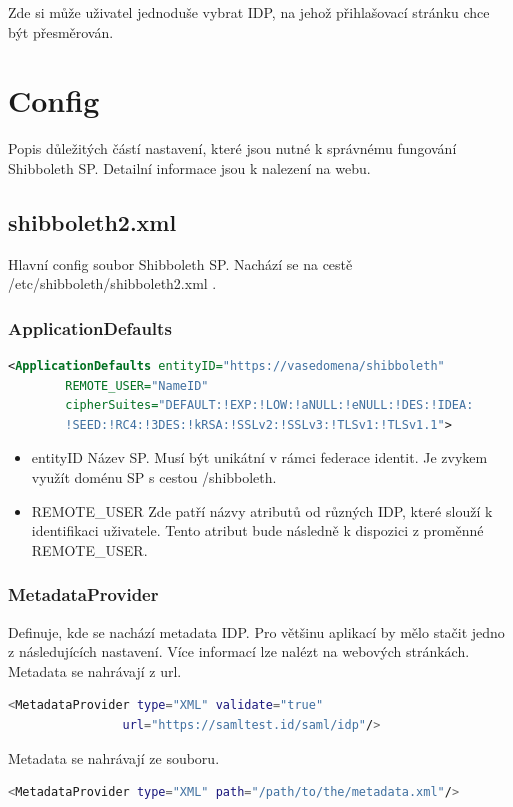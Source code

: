 Zde si může uživatel jednoduše vybrat IDP, na jehož přihlašovací stránku chce být přesměrován.

\chapter{Config}
Popis důležitých částí nastavení, které jsou nutné k správnému fungování Shibboleth SP. Detailní informace jsou k nalezení na webu\cite{SPconfig}. 

\section{shibboleth2.xml}
Hlavní config soubor Shibboleth SP. Nachází se na cestě /etc/shibboleth/shibboleth2.xml .

\subsection{ApplicationDefaults}
\begin{lstlisting}[language=xml]
<ApplicationDefaults entityID="https://vasedomena/shibboleth"
        REMOTE_USER="NameID"
        cipherSuites="DEFAULT:!EXP:!LOW:!aNULL:!eNULL:!DES:!IDEA:
        !SEED:!RC4:!3DES:!kRSA:!SSLv2:!SSLv3:!TLSv1:!TLSv1.1">
\end{lstlisting}
\begin{itemize}
    \item entityID \linebreak
    Název SP. Musí být unikátní v rámci federace identit. Je zvykem využít doménu SP s cestou /shibboleth.  
    \item REMOTE\_USER \linebreak
    Zde patří názvy atributů od různých IDP, které slouží k identifikaci uživatele. 
    Tento atribut bude následně k dispozici z proměnné REMOTE\_USER.
\end{itemize}
\subsection{MetadataProvider}
Definuje, kde se nachází metadata IDP. Pro většinu aplikací by mělo stačit jedno z následujících nastavení. Více informací lze nalézt na webových stránkách\cite{MetadataProvider}.
\linebreak \linebreak
Metadata se nahrávají z url.
\begin{lstlisting}[language=Bash]
 <MetadataProvider type="XML" validate="true"
                url="https://samltest.id/saml/idp"/>
\end{lstlisting}
Metadata se nahrávají ze souboru.
\begin{lstlisting}[language=Bash]
 <MetadataProvider type="XML" path="/path/to/the/metadata.xml"/>
\end{lstlisting}


